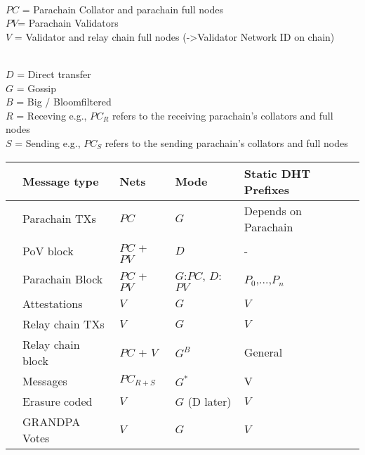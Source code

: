 \\
$PC$ = Parachain Collator and parachain full nodes
\\
$PV$= Parachain Validators
\\
$V$ = Validator and relay chain full nodes (->Validator Network ID on chain)

\\
$D$ = Direct transfer
\\
$G$ = Gossip
\\
$B$ = Big / Bloomfiltered
\\
$R$ = Receving e.g., $PC_{R}$ refers to the receiving parachain's collators and full nodes
\\
$S$ = Sending e.g., $PC_{S}$ refers to the sending parachain's collators and full nodes

\begin{table}[h]
\begin{tabular}{lllll}
& \textbf{Message type}  & \textbf{Nets}  & \textbf{Mode}  & \textbf{Static DHT Prefixes} \\
\hline
& Parachain TXs  & $PC$   & $G$   &Depends on Parachain\\
& PoV block  & $PC$ + $PV$  & $D$         & - \\
& Parachain Block & $PC$ + $PV$   & $G$:$PC$, $D$:$PV$ &$P_0$,...,$P_n$\\
& Attestations   & $V$   & $G$  & $V$ \\
& Relay chain TXs & $V$    & $G$   & $V$ \\
& Relay chain block & $PC$ + $V$  & $G^B$   & General \\
& Messages  & $PC_{R + S}$ & $G^*$     & V \\
& Erasure coded    & $V$           & $G$ (D later)        &$V$\\
& GRANDPA Votes   &$V$          & $G$      &$V$\\
\end{tabular}
\end{table}

